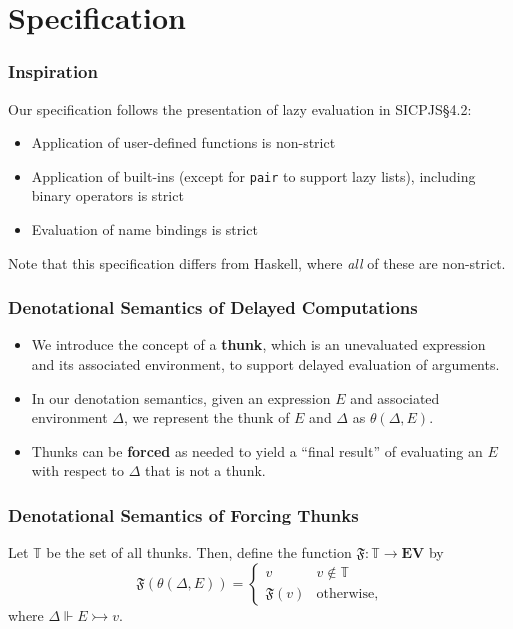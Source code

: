 \documentclass[12pt]{beamer}
\begin{document}
\section{Specification}

\begin{frame}
\frametitle{Inspiration}
Our specification follows the presentation of lazy evaluation in SICPJS\S4.2:\pause[1]
\begin{itemize}
\item<2->Application of user-defined functions is non-strict
\item<3->Application of built-ins (except for \texttt{pair} to support lazy lists), including binary operators is strict
\item<4->Evaluation of name bindings is strict
\end{itemize}
\pause[5]Note that this specification differs from Haskell, where \textit{all} of these are non-strict.
\end{frame}

\begin{frame}
\frametitle{Denotational Semantics of Delayed Computations}
\begin{itemize}
\item<1-> We introduce the concept of a \textbf{thunk}, which is an unevaluated expression and its associated environment, to support delayed evaluation of arguments.
\item<2-> In our denotation semantics, given an expression $E$ and associated environment $\Delta$, we represent the thunk of $E$ and $\Delta$ as $\theta(\Delta, E)$.
\item<3-> Thunks can be \textbf{forced} as needed to yield a ``final result'' of evaluating an $E$ with respect to $\Delta$ that is not a thunk.
\end{itemize}
\end{frame}

\begin{frame}
\frametitle{Denotational Semantics of Forcing Thunks}
Let $\mathbb{T}$ be the set of all thunks. Then, define the function $\mathfrak{F}:\mathbb{T}\to\textbf{EV}$ by
\[ \mathfrak{F}\left(\theta(\Delta, E)\right) = \begin{cases} 
      v & v\notin\mathbb{T} \\
      \mathfrak{F}(v) & \text{otherwise},
   \end{cases}
\]
where $\Delta\Vdash E \rightarrowtail v$.



\end{frame}
\end{document}
